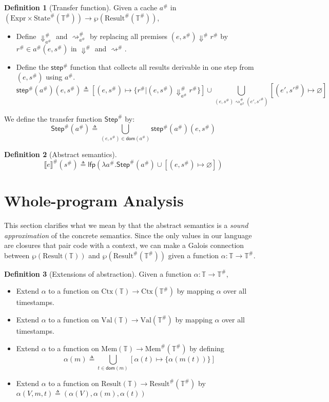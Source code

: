 \documentclass[acmsmall,review]{acmart}\settopmatter{printfolios=true,printccs=false,printacmref=false}
\theoremstyle{definition}
\newtheorem{definition}{Definition}[section]
\newcommand*{\A}[1]{{#1}^{\#}}
\newcommand*{\Expr}{\text{Expr}}
\newcommand*{\Time}{\mathbb{T}}
\newcommand*{\ATime}{\A{\Time}}
\newcommand*{\Ctx}[1]{\text{Ctx}({#1})}
\newcommand*{\Value}[1]{\text{Val}({#1})}
\newcommand*{\Mem}[1]{\text{Mem}({#1})}
\newcommand*{\mem}{m}
\newcommand*{\AMem}[1]{\A{\text{Mem}}({#1})}
\newcommand*{\AState}[1]{\A{\text{State}}({#1})}
\newcommand*{\Result}[1]{\text{Result}({#1})}
\newcommand*{\AResult}[1]{\A{\text{Result}}({#1})}
\newcommand*{\sembracket}[1]{\lBrack{#1}\rBrack}
\begin{document}
\begin{definition}[Transfer function]
  Given a cache $\A{a}$ in $(\Expr\times\AState{\ATime})\rightarrow{\wp(\AResult{\ATime})}$,

  \begin{itemize}
    \item Define $\A{\Downarrow}_{\A{a}}$ and $\A{\rightsquigarrow}_{\A{a}}$ by replacing all premises $(e,\A{s})\A\Downarrow\A{r}$ by $\A{r}\in\A{a}(e,\A{s})$ in $\A\Downarrow$ and $\A\rightsquigarrow$.
    \item Define the $\A{\mathsf{step}}$ function that collects all results derivable in one step from $(e,\A{s})$ using $\A{a}$.
          \[
            \A{\mathsf{step}}(\A{a})(e,\A{s})\triangleq
            [(e,\A{s})\mapsto\{\A{r}|(e,\A{s})\A{\Downarrow}_{\A{a}}\A{r}\}]
            \cup
            \bigcup_{(e,\A{s})\A{\rightsquigarrow}_{\A{a}}(e',\A{s'})}[(e',\A{s'})\mapsto\varnothing]
          \]
  \end{itemize}

  We define the transfer function $\A{\mathsf{Step}}$ by:
  \[
    \A{\mathsf{Step}}(\A{a})\triangleq
    \bigcup_{(e,\A{s})\in\mathsf{dom}(\A{a})}
    {\A{\mathsf{step}}(\A{a})(e,\A{s})}
  \]
\end{definition}

\begin{definition}[Abstract semantics]
  \[
    \A{\sembracket{e}}(\A{s})\triangleq\mathsf{lfp}(\lambda \A{a}.\A{\mathsf{Step}}(\A{a})\cup[(e,\A{s})\mapsto\varnothing])
  \]
\end{definition}

\section{Whole-program Analysis}
This section clarifies what we mean by that the abstract semantics is a \emph{sound approximation} of the concrete semantics.
Since the only values in our language are closures that pair code with a context, we can make a Galois connection between $\wp(\Result{\Time})$ and $\wp(\AResult{\ATime})$ given a function $\alpha:\Time\rightarrow\ATime$.

\begin{definition}[Extensions of abstraction]
  Given a function $\alpha:\Time\rightarrow\ATime$,
  \begin{itemize}
    \item Extend $\alpha$ to a function on $\Ctx{\Time}\rightarrow\Ctx{\ATime}$ by mapping $\alpha$ over all timestamps.
    \item Extend $\alpha$ to a function on $\Value{\Time}\rightarrow\Value{\ATime}$ by mapping $\alpha$ over all timestamps.
    \item Extend $\alpha$ to a function on $\Mem{\Time}\rightarrow\AMem{\ATime}$ by defining
          \[\alpha(\mem)\triangleq\bigcup_{t\in\mathsf{dom}(\mem)}[\alpha(t)\mapsto\{\alpha(\mem(t))\}]\]
    \item Extend $\alpha$ to a function on $\Result{\Time}\rightarrow\AResult{\ATime}$ by $\alpha(V,\mem,t)\triangleq(\alpha(V),\alpha(\mem),\alpha(t))$
  \end{itemize}
\end{definition}
\end{document}
